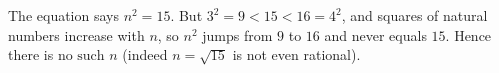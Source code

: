 The equation says $n^2=15$. But $3^2=9<15<16=4^2$, and squares of natural numbers increase with $n$, so $n^2$ jumps from $9$ to $16$ and never equals $15$. Hence there is $\boxed{\text{no such }n}$ (indeed $n=\sqrt{15}$ is not even rational).
